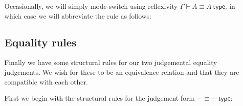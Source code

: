 \begin{remark}
    Occasionally, we will simply mode-switch using reflexivity $\Gamma \vdash A \equiv A \ \mathsf{type}$, in which case we will abbreviate the rule as follows:
    \begin{prooftree}
    \end{prooftree}
\end{remark}

\subsection{Equality rules}
Finally we have some structural rules for our two judgemental equality judgements. We wish for these to be an equivalence relation and that they are compatible with each other.

First we begin with the structural rules for the judgement form $- \equiv -\ \mathsf{type}$:

